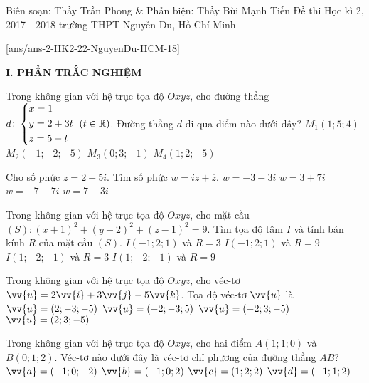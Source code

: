 \begin{name}
{Biên soạn: Thầy Trần Phong \& Phản biện: Thầy Bùi Mạnh Tiến}
{Đề thi Học kì 2, 2017 - 2018 trường THPT Nguyễn Du, Hồ Chí Minh}
\end{name}
\setcounter{ex}{0}\setcounter{bt}{0}
[ans/ans-2-HK2-22-NguyenDu-HCM-18]

\noindent\textbf{I. PHẦN TRẮC NGHIỆM}

\begin{ex}%
Trong không gian với hệ trục tọa độ $Oxyz$, cho đường thẳng $d\colon\left\{\begin{aligned}& x=1\\&y=2+3t\\&z=5-t\end{aligned}\right.\ (t\in\mathbb R)$. Đường thẳng $d$ đi qua điểm nào dưới đây?
\choice
{\True $M_1(1;5;4)$}
{$M_2(-1;-2;-5)$}
{$M_3(0;3;-1)$}
{$M_4(1;2;-5)$}
\end{ex}

\begin{ex}%
Cho số phức $z=2+5i$. Tìm số phức $w=iz+\overline{z}$.
\choice
{\True $w=-3-3i$}
{$w=3+7i$}
{$w=-7-7i$}
{$w=7-3i$}
\end{ex}

\begin{ex}%
Trong không gian với hệ trục tọa độ $Oxyz$, cho mặt cầu $(S)\colon (x+1)^2+(y-2)^2+(z-1)^2=9$. Tìm tọa độ tâm $I$ và tính bán kính $R$ của mặt cầu $(S)$.
\choice
{\True $I(-1;2;1)$ và $R=3$}
{$I(-1;2;1)$ và $R=9$}
{$I(1;-2;-1)$ và $R=3$}
{$I(1;-2;-1)$ và $R=9$}
\end{ex}

\begin{ex}%
Trong không gian với hệ trục tọa độ $Oxyz$, cho véc-tơ $\vv{u}=2\vv{i}+3\vv{j}-5\vv{k}$. Tọa độ véc-tơ $\vv{u}$ là
\choice
{$\vv{u}=(2;-3;-5)$}
{$\vv{u}=(-2;-3;5)$}
{$\vv{u}=(-2;3;-5)$}
{\True $\vv{u}=(2;3;-5)$}
\end{ex}

\begin{ex}%
Trong không gian với hệ trục tọa độ $Oxyz$, cho hai điểm $A(1;1;0)$ và $B(0;1;2)$. Véc-tơ nào dưới đây là véc-tơ chỉ phương của đường thẳng $AB$?
\choice
{$\vv{a}=(-1;0;-2)$}
{\True $\vv{b}=(-1;0;2)$}
{$\vv{c}=(1;2;2)$}
{$\vv{d}=(-1;1;2)$}
\end{ex}

